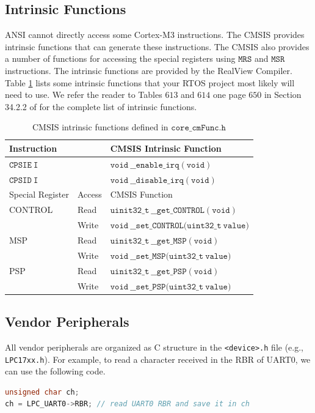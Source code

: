 \subsection{Intrinsic Functions}

ANSI cannot directly access some Cortex-M3 instructions. The CMSIS provides
intrinsic functions that can generate these instructions. The CMSIS also provides a number of functions for accessing the special registers using $\mathtt{MRS}$ and $\mathtt{MSR}$ instructions. The intrinsic functions are provided by the RealView Compiler.  Table \ref{tb_intrinsic_func} lists some intrinsic functions that your RTOS project most likely will need to use. 
We refer the reader to Tables $613$ and $614$ one page $650$ in Section 34.2.2 of \cite{nxp.lpc17xx.manual} for the complete list of intrinsic functions. 
\begin{table}
\begin{center}
\begin{tabular}{lll}
\hline
Instruction & & CMSIS Intrinsic Function \\ \hline
$\mathtt{CPSIE~ I}$ &   & $\mathtt{void~ \_\_enable\_irq(void)}$ \\
$\mathtt{CPSID~ I}$ &   & $\mathtt{void~ \_\_disable\_irq(void)}$ \\ 
\hline \hline 
Special Register & Access & CMSIS Function \\ \hline
CONTROL      & Read   & $\mathtt{uinit32\_t~ \_\_get\_CONTROL(void)}$ \\
             & Write  & $\mathtt{void~ \_\_set\_CONTROL(uint32\_t~ value})$\\
\hline
MSP          & Read   & $\mathtt{uinit32\_t~ \_\_get\_MSP(void)}$ \\
             & Write  & $\mathtt{void~ \_\_set\_MSP(uint32\_t~ value})$\\
\hline
PSP          & Read   & $\mathtt{uinit32\_t~ \_\_get\_PSP(void)}$ \\
             & Write  & $\mathtt{void~ \_\_set\_PSP(uint32\_t~ value})$\\
\hline
\end{tabular}
\caption[CMSIS intrinsic functions]
        {CMSIS intrinsic functions defined in $\mathtt{core\_cmFunc.h}$}
\label{tb_intrinsic_func}
\end{center}
\end{table}

\subsection{Vendor Peripherals}
All vendor peripherals are organized as C structure in the 
\verb|<device>.h| file (e.g., \verb|LPC17xx.h|). For example, to read
a character received in the RBR of UART0, we can use the following code. 
\begin{lstlisting}[language=C]
unsigned char ch;
ch = LPC_UART0->RBR; // read UART0 RBR and save it in ch  
\end{lstlisting}

